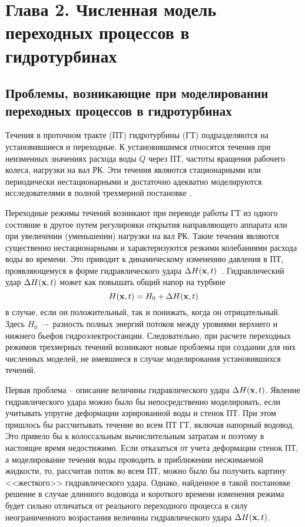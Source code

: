 ﻿%
\chapter*{Глава 2. Численная модель переходных процессов в гидротурбинах}
\label{s:2}
\setcounter{chapter}{2}
\setcounter{section}{0}

\section{Проблемы, возникающие при моделировании переходных процессов в гидротурбинах}
\label{s:20}
Течения в проточном тракте (ПТ) гидротурбины (ГТ) подразделяются на установившиеся и переходные.
К установившимся относятся течения при неизменных значениях расхода воды $Q$ через ПТ, частоты
вращения рабочего колеса, нагрузки на вал РК. Эти течения являются стационарными или
периодически нестационарными и достаточно адекватно моделируются исследователями в полной
трехмерной постановке \cite{Cher,Rupr,Vunen1,Vunen2,Vu}.

Переходные режимы течений возникают при переводе работы ГТ из одного состояние в другое путем регулировки 
открытия направляющего аппарата или при увеличении (уменьшении) нагрузки на вал РК. Такие течения
являются существенно нестационарными и характеризуются резкими колебаниями расхода воды во времени. Это 
приводит к динамическому изменению давления в ПТ, проявляющемуся в форме гидравлического удара 
$\Delta H({\bf x}, t)$~\cite{jukovskii}. Гидравлический удар $\Delta H({\bf x}, t)$ может как повышать
общий напор на турбине
\begin{equation}
H({\bf x}, t)=H_0+\Delta H({\bf x}, t)
\end{equation}
в случае, если он положительный, так и понижать, когда он отрицательный. Здесь $H_0$~–-~разность полных 
энергий потоков между уровнями верхнего и нижнего бьефов гидроэлектростанции.
Следовательно, при расчете переходных режимов трехмерных течений возникают новые проблемы при создании для них 
численных моделей, не имевшиеся в случае моделирования установившихся течений. 

Первая проблема -- описание величины гидравлического удара $\Delta H({\bf x}, t)$. 
Явление гидравлического удара можно было бы
непосредственно моделировать, если учитывать упругие деформации аэрированной воды и стенок ПТ. При этом 
пришлось бы рассчитывать течение во всем ПТ ГТ, включая напорный водовод. Это привело бы к колоссальным 
вычислительным затратам и поэтому в настоящее время недостижимо. Если отказаться от учета деформации стенок 
ПТ, а моделирование течения воды проводить в приближении несжимаемой жидкости, то, рассчитав поток во всем ПТ, 
можно было бы получить картину <<жесткого>> гидравлического удара. Однако, найденное в такой постановке 
решение в случае длинного водовода и короткого времени изменения режима будет сильно отличаться от реального
переходного процесса в силу неограниченного возрастания величины гидравлического удара $\Delta H({\bf x}, t)$.

